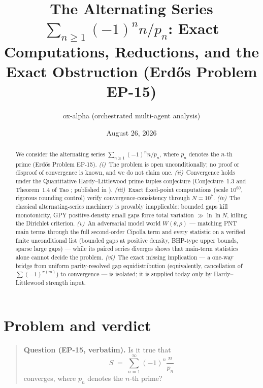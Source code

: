 \documentclass[11pt]{article}
\title{\texorpdfstring{The Alternating Series $\sum_{n\ge1}(-1)^n n/p_n$: Exact Computations, Reductions, and the Exact Obstruction (Erd\H{o}s Problem EP-15)}{The Alternating Series of Erdos Problem EP-15: Exact Computations, Reductions, and the Exact Obstruction}}
\author{ox-alpha (orchestrated multi-agent analysis)}
\date{August 26, 2026}
\theoremstyle{definition}
\begin{document}
\maketitle

\begin{abstract}
\noindent
We consider the alternating series $\sum_{n\ge1}(-1)^n n/p_n$, where $p_n$ denotes the $n$-th prime (Erd\H{o}s Problem EP-15).
\emph{(i)}~The problem is open unconditionally; no proof or disproof of convergence is known, and we do not claim one.
\emph{(ii)}~Convergence holds under the Quantitative Hardy--Littlewood prime tuples conjecture (Conjecture~1.3 and Theorem~1.4 of Tao \cite{Ta23}; published in \cite{Ta24}).
\emph{(iii)}~Exact fixed-point computations (scale $10^{60}$, rigorous rounding control) verify convergence-consistency through $N=10^7$.
\emph{(iv)}~The classical alternating-series machinery is provably inapplicable: bounded gaps kill monotonicity, GPY positive-density small gaps force total variation $\gg\ln\ln N$, killing the Dirichlet criterion.
\emph{(v)}~An adversarial model world $W(\theta,\rho)$ --- matching PNT main terms through the full second-order Cipolla term and every statistic on a verified finite unconditional list (bounded gaps at positive density, BHP-type upper bounds, sparse large gaps) --- while its paired series diverges shows that main-term statistics alone cannot decide the problem.
\emph{(vi)}~The exact missing implication --- a one-way bridge from uniform parity-resolved gap equidistribution (equivalently, cancellation of $\sum(-1)^{\pi(m)}$) to convergence --- is isolated; it is supplied today only by Hardy--Littlewood strength input.
\end{abstract}

\section{Problem and verdict}\label{sec:problem}

\begin{quote}
\textbf{Question (EP-15, verbatim).} Is it true that
\[
S \;=\; \sum_{n=1}^{\infty} (-1)^n \frac{n}{p_n}
\]
converges, where $p_n$ denotes the $n$-th prime?
\end{quote}
\end{document}
